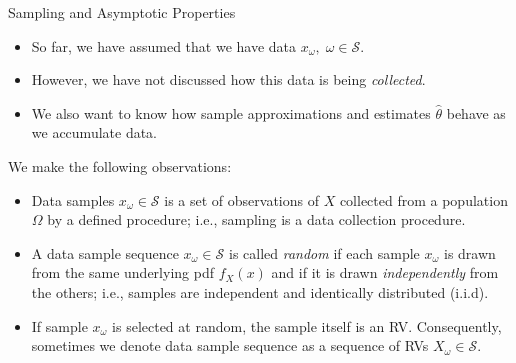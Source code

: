 \documentclass[handout,9pt]{beamer}
\begin{document}
%
\begin{frame}{Sampling and Asymptotic Properties}

\begin{itemize}
\item So far, we have assumed that we have data $x_\omega,\; \omega \in \mathcal{S}$. 
\item However, we have not discussed how this data is being {\em collected}.  
\item We also want to know how sample approximations and estimates $\hat{\theta}$ behave as we accumulate data.  
\end{itemize}
We make the following observations:
\begin{block}{}
\begin{itemize}
\setlength{\itemsep}{10pt}
\item Data samples $x_\omega \in \mathcal{S}$ is a set of observations of $X$ collected from a population $\Omega$ by a defined procedure; i.e., sampling is a data collection procedure. 

\item A data sample sequence $x_\omega \in \mathcal{S}$ is called {\em random} if each sample $x_\omega$ is drawn from the same underlying pdf $f_X(x)$ and if it is drawn {\em independently} from the others; i.e., samples are independent and identically distributed (i.i.d).

\item If sample $x_\omega$ is selected at random, the sample itself is an RV. Consequently, sometimes we denote data sample sequence as a sequence of RVs $X_\omega \in \mathcal{S}$.  

\end{itemize}
\end{block}

\end{frame}
\end{document}
